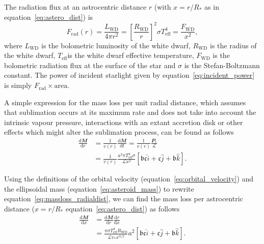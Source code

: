 \documentclass[fleqn,usenatbib]{mnras}
\begin{document}
The radiation flux at an astrocentric distance $r$ (with $x = r/R_*$ as in equation~\ref{eq:astero_dist}) is
\begin{equation}
    \label{eq:radflux}
    F_\text{rad}\left(r\right) = \frac{L_\text{WD}}{4 \pi r^2} = \left[\frac{R_\text{WD}}{r}\right]^2 \sigma T_\text{eff}^4 = \frac{F_\text{WD}}{x^2},
\end{equation}
where $L_\text{WD}$ is the bolometric luminosity of the white dwarf,  $R_\text{WD}$ is the radius of the white dwarf, $T_\text{eff}$is the white dwarf effective temperature, $F_\text{WD}$ is the bolometric radiation flux at the surface of the star and $\sigma$ is the Stefan-Boltzmann constant. 
The power of incident starlight given by equation~\ref{eq:incident_power} is simply $F_\text{rad} \times \text{area}$.

A simple expression for the mass loss per unit radial distance, which assumes that sublimation occurs at its maximum rate and does not take into account the intrinsic vapour pressure, interactions with an extant accretion disk or other effects which might alter the sublimation process, can be found as follows
\begin{equation}
    \begin{aligned}
    \label{eq:massloss_radialdist}
        \frac{\mathrm{d}\mathbfit{M}}{\mathrm{d}r} &= \frac{1}{v(r)} \frac{\mathrm{d}\mathbfit{M}}{\mathrm{d}t} = \frac{1}{v(r)} \frac{\mathbfit{P}_*}{\mathcal{L}}  \\ &= \frac{1}{v(r)}\frac{a^2 \pi T_\text{eff}^4 \sigma }{\mathcal{L} x^2} \left[ \mathfrak{b} \mathfrak{c} \hat{i} + \mathfrak{c} \hat{j} + \mathfrak{b} \hat{k} \right].
    \end{aligned}
\end{equation}

Using the definitions of the orbital velocity (equation~\ref{eq:orbital_velocity}) and the ellipsoidal mass (equation~\ref{eq:asteroid_mass}) to rewrite equation~\ref{eq:massloss_radialdist}, we can find the mass loss per astrocentric distance ($x = r/R_*$ equation~\ref{eq:astero_dist}) as follows
\begin{equation}
    \begin{aligned}
    \label{eq:masschange_astrodist}
    \frac{\mathrm{d}\mathbfit{M}}{\mathrm{d}x} &= \frac{\mathrm{d}\mathbfit{M}}{\mathrm{d}r} \frac{\mathrm{d}r}{\mathrm{d}x} \\ 
    &= \frac{\pi \sigma T_\text{eff}^4 R_\text{WD}}{\mathcal{L} v_* x^{3/2}} a^2  \left[ \mathfrak{b} \mathfrak{c} \hat{i} + \mathfrak{c} \hat{j} + \mathfrak{b} \hat{k} \right].
    \end{aligned}
\end{equation}
\end{document}
